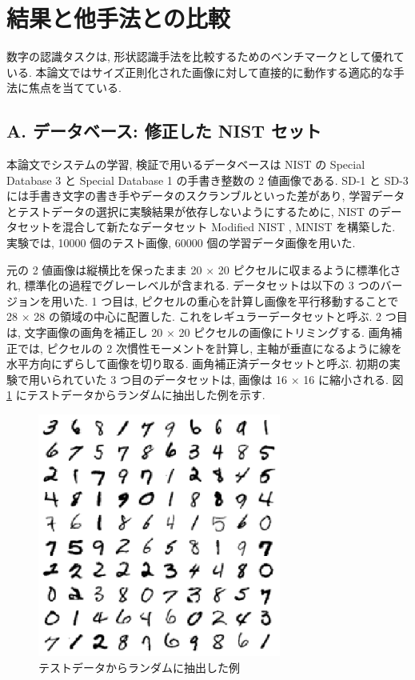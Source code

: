\documentclass[twocolumn]{jarticle}     %
\begin{document}
 \section{結果と他手法との比較}
 数字の認識タスクは, 形状認識手法を比較するためのベンチマークとして優れている. 
 本論文ではサイズ正則化された画像に対して直接的に動作する適応的な手法に焦点を当てている.

 \subsection*{A. データベース: 修正した NIST セット}

本論文でシステムの学習, 検証で用いるデータベースは NIST の Special Database 3 と Special Database 1 の手書き整数の 2 値画像である. SD-1 と SD-3 には手書き文字の書き手やデータのスクランブルといった差があり, 
学習データとテストデータの選択に実験結果が依存しないようにするために, NIST のデータセットを混合して新たなデータセット Modified NIST , MNIST を構築した.
実験では, 10000 個のテスト画像, 60000 個の学習データ画像を用いた. 
\par
元の 2 値画像は縦横比を保ったまま 20 × 20 ピクセルに収まるように標準化され, 標準化の過程でグレーレベルが含まれる.
データセットは以下の 3 つのバージョンを用いた.
1 つ目は, ピクセルの重心を計算し画像を平行移動することで 28 × 28 の領域の中心に配置した. これをレギュラーデータセットと呼ぶ. 
2 つ目は, 文字画像の画角を補正し 20 × 20 ピクセルの画像にトリミングする. 画角補正では, ピクセルの 2 次慣性モーメントを計算し, 主軸が垂直になるように線を水平方向にずらして画像を切り取る. 
画角補正済データセットと呼ぶ.
 初期の実験で用いられていた 3 つ目のデータセットは, 画像は 16 × 16 に縮小される. 図 \ref{fig:4} にテストデータからランダムに抽出した例を示す.
 \begin{figure}[t]
  \centering
  \includegraphics[width=80mm]{assets/4.eps}
  \caption{テストデータからランダムに抽出した例}
  \label{fig:4}
\end{figure}
\end{document}
